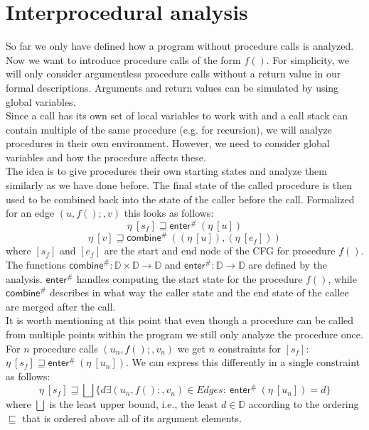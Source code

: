   \section{Interprocedural analysis}
    So far we only have defined how a program without procedure calls is analyzed. Now we want to introduce procedure calls of the form $f()$. For simplicity, we will only consider argumentless procedure calls without a return value in our formal descriptions. Arguments and return values can be simulated by using global variables.\\
    Since a call has its own set of local variables to work with and a call stack can contain multiple of the same procedure (e.g. for recursion), we will analyze procedures in their own environment. However, we need to consider global variables and how the procedure affects these.\\
    The idea is to give procedures their own starting states and analyze them similarly as we have done before. The final state of the called procedure is then used to be combined back into the state of the caller before the call. Formalized for an edge $(u, f();, v)$ this looks as follows:
    \[\eta\ [s_f] \sqsupseteq \textsf{enter}^{\#}\ (\eta\ [u]) \]
    \[\eta\ [v] \sqsupseteq  \textsf{combine}^{\#}\ ((\eta\ [u]), (\eta\ [e_f])) \]
    where $[s_f]$ and $[e_f]$ are the start and end node of the CFG for procedure $f()$. The functions $\textsf{combine}^{\#}: \mathbb{D} \times \mathbb{D} \rightarrow \mathbb{D}$ and $\textsf{enter}^{\#}: \mathbb{D} \rightarrow \mathbb{D}$ are defined by the analysis. $\textsf{enter}^{\#}$ handles computing the start state for the procedure $f()$, while $\textsf{combine}^{\#}$ describes in what way the caller state and the end state of the callee are merged after the call.\\
    It is worth mentioning at this point that even though a procedure can be called from multiple points within the program we still only analyze the procedure once. For $n$ procedure calls $(u_n, f();, v_n)$ we get $n$ constraints for $[s_f]$: $\eta\ [s_f] \sqsupseteq \textsf{enter}^{\#}\ (\eta\ [u_n])$. We can express this differently in a single constraint as follows:
    \[\eta\ [s_f] \sqsupseteq \bigsqcup \{ d \exists (u_n, f();, v_n) \in Edges:\ \textsf{enter}^{\#}\ (\eta\ [u_n]) = d \}\]
    where $\bigsqcup$ is the least upper bound, i.e., the least $d \in \mathbb{D}$ according to the ordering $\sqsubseteq$ that is ordered above all of its argument elements.\\
    \\

